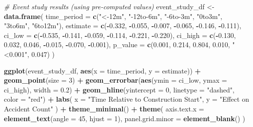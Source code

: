 \documentclass[
]{article}
\newenvironment{Shaded}{\begin{snugshade}}{\end{snugshade}}
\newcommand{\AttributeTok}[1]{\textcolor[rgb]{0.13,0.29,0.53}{#1}}
\newcommand{\CommentTok}[1]{\textcolor[rgb]{0.56,0.35,0.01}{\textit{#1}}}
\newcommand{\DecValTok}[1]{\textcolor[rgb]{0.00,0.00,0.81}{#1}}
\newcommand{\FloatTok}[1]{\textcolor[rgb]{0.00,0.00,0.81}{#1}}
\newcommand{\FunctionTok}[1]{\textcolor[rgb]{0.13,0.29,0.53}{\textbf{#1}}}
\newcommand{\NormalTok}[1]{#1}
\newcommand{\OtherTok}[1]{\textcolor[rgb]{0.56,0.35,0.01}{#1}}
\newcommand{\SpecialCharTok}[1]{\textcolor[rgb]{0.81,0.36,0.00}{\textbf{#1}}}
\newcommand{\StringTok}[1]{\textcolor[rgb]{0.31,0.60,0.02}{#1}}
\begin{document}
\begin{Shaded}
\begin{Highlighting}[]
\CommentTok{\# Event study results (using pre{-}computed values)}
\NormalTok{event\_study\_df }\OtherTok{\textless{}{-}} \FunctionTok{data.frame}\NormalTok{(}
  \AttributeTok{time\_period =} \FunctionTok{c}\NormalTok{(}\StringTok{"\textless{}{-}12m"}\NormalTok{, }\StringTok{"{-}12to{-}6m"}\NormalTok{, }\StringTok{"{-}6to{-}3m"}\NormalTok{, }\StringTok{"0to3m"}\NormalTok{, }\StringTok{"3to6m"}\NormalTok{, }\StringTok{"6to12m"}\NormalTok{),}
  \AttributeTok{estimate =} \FunctionTok{c}\NormalTok{(}\SpecialCharTok{{-}}\FloatTok{0.332}\NormalTok{, }\SpecialCharTok{{-}}\FloatTok{0.055}\NormalTok{, }\SpecialCharTok{{-}}\FloatTok{0.007}\NormalTok{, }\SpecialCharTok{{-}}\FloatTok{0.065}\NormalTok{, }\SpecialCharTok{{-}}\FloatTok{0.146}\NormalTok{, }\SpecialCharTok{{-}}\FloatTok{0.111}\NormalTok{),}
  \AttributeTok{ci\_low =} \FunctionTok{c}\NormalTok{(}\SpecialCharTok{{-}}\FloatTok{0.535}\NormalTok{, }\SpecialCharTok{{-}}\FloatTok{0.141}\NormalTok{, }\SpecialCharTok{{-}}\FloatTok{0.059}\NormalTok{, }\SpecialCharTok{{-}}\FloatTok{0.114}\NormalTok{, }\SpecialCharTok{{-}}\FloatTok{0.221}\NormalTok{, }\SpecialCharTok{{-}}\FloatTok{0.220}\NormalTok{),}
  \AttributeTok{ci\_high =} \FunctionTok{c}\NormalTok{(}\SpecialCharTok{{-}}\FloatTok{0.130}\NormalTok{, }\FloatTok{0.032}\NormalTok{, }\FloatTok{0.046}\NormalTok{, }\SpecialCharTok{{-}}\FloatTok{0.015}\NormalTok{, }\SpecialCharTok{{-}}\FloatTok{0.070}\NormalTok{, }\SpecialCharTok{{-}}\FloatTok{0.001}\NormalTok{),}
  \AttributeTok{p\_value =} \FunctionTok{c}\NormalTok{(}\FloatTok{0.001}\NormalTok{, }\FloatTok{0.214}\NormalTok{, }\FloatTok{0.804}\NormalTok{, }\FloatTok{0.010}\NormalTok{, }\StringTok{"\textless{}0.001"}\NormalTok{, }\FloatTok{0.047}\NormalTok{)}
\NormalTok{)}

\FunctionTok{ggplot}\NormalTok{(event\_study\_df, }\FunctionTok{aes}\NormalTok{(}\AttributeTok{x =}\NormalTok{ time\_period, }\AttributeTok{y =}\NormalTok{ estimate)) }\SpecialCharTok{+}
  \FunctionTok{geom\_point}\NormalTok{(}\AttributeTok{size =} \DecValTok{3}\NormalTok{) }\SpecialCharTok{+}
  \FunctionTok{geom\_errorbar}\NormalTok{(}\FunctionTok{aes}\NormalTok{(}\AttributeTok{ymin =}\NormalTok{ ci\_low, }\AttributeTok{ymax =}\NormalTok{ ci\_high), }\AttributeTok{width =} \FloatTok{0.2}\NormalTok{) }\SpecialCharTok{+}
  \FunctionTok{geom\_hline}\NormalTok{(}\AttributeTok{yintercept =} \DecValTok{0}\NormalTok{, }\AttributeTok{linetype =} \StringTok{"dashed"}\NormalTok{, }\AttributeTok{color =} \StringTok{"red"}\NormalTok{) }\SpecialCharTok{+}
  \FunctionTok{labs}\NormalTok{(}
    \AttributeTok{x =} \StringTok{"Time Relative to Construction Start"}\NormalTok{,}
    \AttributeTok{y =} \StringTok{"Effect on Accident Count"}
\NormalTok{  ) }\SpecialCharTok{+}
  \FunctionTok{theme\_minimal}\NormalTok{() }\SpecialCharTok{+}
  \FunctionTok{theme}\NormalTok{(}
    \AttributeTok{axis.text.x =} \FunctionTok{element\_text}\NormalTok{(}\AttributeTok{angle =} \DecValTok{45}\NormalTok{, }\AttributeTok{hjust =} \DecValTok{1}\NormalTok{),}
    \AttributeTok{panel.grid.minor =} \FunctionTok{element\_blank}\NormalTok{()}
\NormalTok{  )}
\end{Highlighting}
\end{Shaded}
\end{document}
